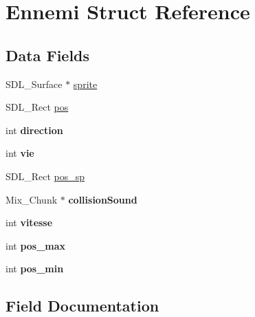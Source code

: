 \hypertarget{structEnnemi}{}\section{Ennemi Struct Reference}
\label{structEnnemi}
\subsection*{Data Fields}
\begin{DoxyCompactItemize}
\item 
S\+D\+L\+\_\+\+Surface $\ast$ \hyperlink{structEnnemi_adb0efeb167c3a5c5981ec5ef704ee94b}{sprite}
\item 
S\+D\+L\+\_\+\+Rect \hyperlink{structEnnemi_a3d61487c6391b8391b4334cb3f5272e7}{pos}
\item 
\mbox{\label{structEnnemi_a5fcc1b018d910c113d7f1cf2771fb900}} 
int {\bfseries direction}
\item 
\mbox{\label{structEnnemi_a1f15d2fdeb991ed73e000b7ac87621ea}} 
int {\bfseries vie}
\item 
S\+D\+L\+\_\+\+Rect \hyperlink{structEnnemi_a51c0688f2281052086eb3092cb8ff485}{pos\+\_\+sp}
\item 
\mbox{\label{structEnnemi_abc9b5e2aad9db7aca596c5ccadc49dcb}} 
Mix\+\_\+\+Chunk $\ast$ {\bfseries collision\+Sound}
\item 
\mbox{\label{structEnnemi_a49dc604bc572118ace4b96881ba5d632}} 
int {\bfseries vitesse}
\item 
\mbox{\label{structEnnemi_a1be413223602e2813d0c10eaca64fa7c}} 
int {\bfseries pos\+\_\+max}
\item 
\mbox{\label{structEnnemi_a172a7052d7cde326f6b78079997e0720}} 
int {\bfseries pos\+\_\+min}
\end{DoxyCompactItemize}


\subsection{Field Documentation}
\mbox{\label{structEnnemi_a3d61487c6391b8391b4334cb3f5272e7}} 
